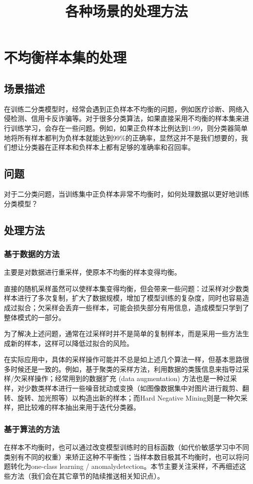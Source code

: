 \documentclass[12pt]{article}
\title{各种场景的处理方法}
\begin{document}
\maketitle

\section{不均衡样本集的处理\cite{Handle_Unbalanced_Samples}}
\subsection{场景描述}
在训练二分类模型时，经常会遇到正负样本不均衡的问题，例如医疗诊断、网络入侵检测、信用卡反诈骗等。对于很多分类算法，如果直接采用不均衡的样本集来进行训练学习，会存在一些问题。例如，如果正负样本比例达到1:99，则分类器简单地将所有样本都判为负样本就能达到99\%的正确率，显然这并不是我们想要的，我们想让分类器在正样本和负样本上都有足够的准确率和召回率。

\subsection{问题}
对于二分类问题，当训练集中正负样本非常不均衡时，如何处理数据以更好地训练分类模型？ 

\subsection{处理方法}
\subsubsection{基于数据的方法}
主要是对数据进行重采样，使原本不均衡的样本变得均衡。

直接的随机采样虽然可以使样本集变得均衡，但会带来一些问题：过采样对少数类样本进行了多次复制，扩大了数据规模，增加了模型训练的复杂度，同时也容易造成过拟合；欠采样会丢弃一些样本，可能会损失部分有用信息，造成模型只学到了整体模式的一部分。

为了解决上述问题，通常在过采样时并不是简单的复制样本，而是采用一些方法生成新的样本，这样可以降低过拟合的风险。

在实际应用中，具体的采样操作可能并不总是如上述几个算法一样，但基本思路很多时候还是一致的。例如，基于聚类的采样方法，利用数据的类簇信息来指导过采样/欠采样操作；经常用到的数据扩充 (data augmentation) 方法也是一种过采样，对少数类样本进行一些噪音扰动或变换（如图像数据集中对图片进行裁剪、翻转、旋转、加光照等）以构造出新的样本；而Hard Negative Mining则是一种欠采样，把比较难的样本抽出来用于迭代分类器。

\subsubsection{基于算法的方法}
在样本不均衡时，也可以通过改变模型训练时的目标函数（如代价敏感学习中不同类别有不同的权重）来矫正这种不平衡性；当样本数目极其不均衡时，也可以将问题转化为one-class learning / anomalydetection。本节主要关注采样，不再细述这些方法（我们会在其它章节的陆续推送相关知识点）。



\end{document}
